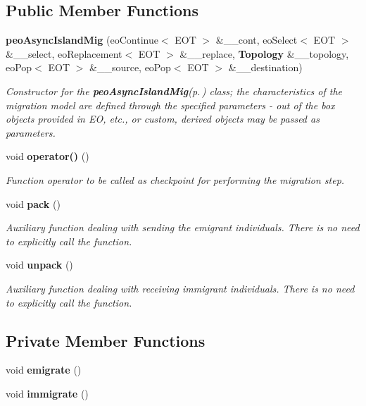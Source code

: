 \subsection*{Public Member Functions}
\begin{CompactItemize}
\item 
{\bf peo\-Async\-Island\-Mig} (eo\-Continue$<$ EOT $>$ \&\_\-\_\-cont, eo\-Select$<$ EOT $>$ \&\_\-\_\-select, eo\-Replacement$<$ EOT $>$ \&\_\-\_\-replace, {\bf Topology} \&\_\-\_\-topology, eo\-Pop$<$ EOT $>$ \&\_\-\_\-source, eo\-Pop$<$ EOT $>$ \&\_\-\_\-destination)
\begin{CompactList}\small\item\em Constructor for the {\bf peo\-Async\-Island\-Mig}{\rm (p.\,\pageref{classpeo_async_island_mig})} class; the characteristics of the migration model are defined through the specified parameters - out of the box objects provided in EO, etc., or custom, derived objects may be passed as parameters. \item\end{CompactList}\item 
void {\bf operator()} ()
\begin{CompactList}\small\item\em Function operator to be called as checkpoint for performing the migration step. \item\end{CompactList}\item 
void {\bf pack} ()\label{classpeo_async_island_mig_6d790a5d0b6ac510cac4f61a1c0d8f16}

\begin{CompactList}\small\item\em Auxiliary function dealing with sending the emigrant individuals. There is no need to explicitly call the function. \item\end{CompactList}\item 
void {\bf unpack} ()\label{classpeo_async_island_mig_455501aee5db2bbfbae15779c8429369}

\begin{CompactList}\small\item\em Auxiliary function dealing with receiving immigrant individuals. There is no need to explicitly call the function. \item\end{CompactList}\end{CompactItemize}
\subsection*{Private Member Functions}
\begin{CompactItemize}
\item 
void {\bf emigrate} ()\label{classpeo_async_island_mig_87a4ef7d4bd30d349a801bf0f9e87c82}

\item 
void {\bf immigrate} ()\label{classpeo_async_island_mig_5a9a64ba51a696e45f91b362c39c9a64}

\end{CompactItemize}
